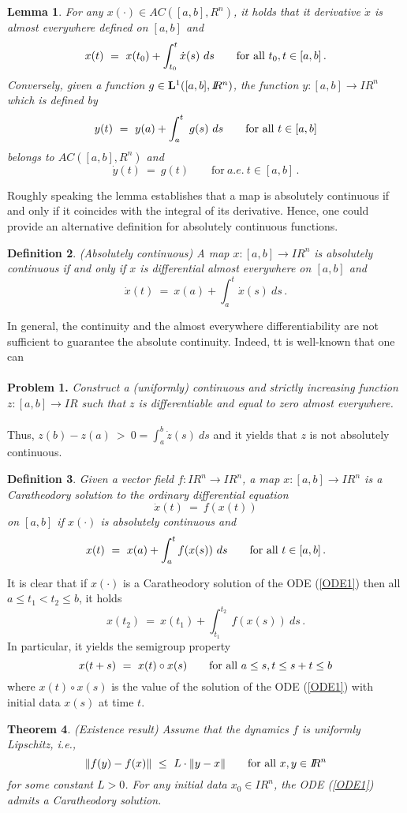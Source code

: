 \documentclass[letterpaper,12pt]{article}
\numberwithin{equation}{section}
\newcommand{\R}{\mathbb{R}}
\def\forall{\hbox{for all}~}
\def\R{I\!\!R}
\newtheorem{theorem}{Theorem}[section]
\newtheorem{definition}[theorem]{Definition}
\newtheorem{lemma}[theorem]{Lemma}
\begin{document}
\begin{lemma} For any $x(\cdot)\in AC([a,b],R^n)$, it holds that it derivative $\dot{x}$ is almost everywhere defined on $[a,b]$ and 
\[
x(t)~=~x(t_0)+\int_{t_0}^t\dot{x}(s)~ds\qquad\forall t_0,t\in [a,b]\,.
\]
Conversely, given a function $g\in {\bf L}^1([a,b],\R^n)$, the function $y: [a,b]\to\R^n$ which is defined by 
\[
y(t)~=~y(a)+\int_{a}^t~g(s)~ds\qquad\forall t\in [a,b]
\]
belongs to $AC([a,b],R^n)$ and 
\[
\dot{y}(t)~=~g(t)\qquad\mathrm{for}~a.e.~t\in [a,b]\,.
\]
\end{lemma}
Roughly speaking the lemma establishes that a map is absolutely continuous if and only if it coincides with the integral of its derivative. Hence, one could provide an alternative definition for absolutely continuous functions.
\begin{definition} (Absolutely continuous) A map $x:[a,b]\to\R^n$ is absolutely continuous if and only if $x$ is differential almost everywhere on $[a,b]$ and 
\[
\dot{x}(t)~=~x(a)+\int_{a}^t\dot{x}(s)~ds\,.
\]
\end{definition}
In general, the continuity and the almost everywhere differentiability are not sufficient to guarantee the absolute continuity. Indeed, tt is well-known that one can
\quad\\
\quad\\
{\bf Problem 1.} {\it Construct a (uniformly) continuous and strictly increasing function $z:[a,b]\to\R$ such that $z$ is differentiable and equal to zero almost everywhere.}
\quad\\
\quad\\
Thus, $z(b)-z(a)~>~0=\int_{a}^{b}\dot{z}(s)~ds$ and it yields that $z$ is not absolutely continuous.
\begin{definition} Given a vector field $f:\R^n\to\R^n$, a map $x:[a,b]\to\R^n$ is a Caratheodory solution to the ordinary differential equation
\[
\dot{x}(t)~=~f(x(t))
\]
on $[a,b]$ if $x(\cdot)$ is absolutely continuous and 
\[
x(t)~=~x(a)+\int_{a}^tf(x(s))~ds\qquad\forall t\in [a,b]\,.
\]
\end{definition}
It is clear that if $x(\cdot)$ is a Caratheodory solution of the ODE (\ref{ODE1}) then all $a\leq t_1<t_2\leq b$, it holds
\[
x(t_2)~=~x(t_1)+\int_{t_1}^{t_2}~f(x(s))~ds\,.
\]
In particular, it yields the semigroup property
\[
x(t+s)~=~x(t)\circ x(s)\qquad\forall a\leq s,t\leq s+t\leq b
\]
where $x(t)\circ x(s)$ is the value of the solution of the ODE (\ref{ODE1}) with initial data $x(s)$ at time $t$.
\begin{theorem}\label{E} (Existence result)
Assume that the dynamics $f$ is uniformly Lipschitz, i.e.,
\[
\|f(y)-f(x)\|~\leq~L\cdot \|y-x\|\qquad\forall x,y\in\R^n
\]
for some constant $L>0$. For any initial data $x_0\in\R^n$, the ODE (\ref{ODE1}) admits a Caratheodory solution.
\end{theorem}
\end{document}
